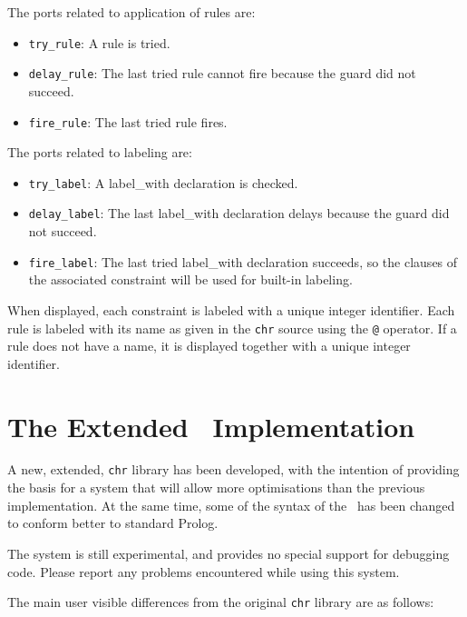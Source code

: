 The ports related to application of rules are:
\begin{itemize}
 \item \verb/try_rule/: A rule is tried.

 \item \verb/delay_rule/: The last tried rule cannot fire because the guard did not succeed.

 \item \verb/fire_rule/: The last tried rule fires.
\end{itemize}

The ports related to labeling are:
\begin{itemize}
 \item \verb/try_label/: A label\_with declaration is checked.

 \item \verb/delay_label/: The last label\_with declaration delays because the guard did not succeed.

 \item \verb/fire_label/: The last tried label\_with declaration succeeds,
so the clauses of the associated constraint will be used for built-in labeling.

\end{itemize}
When displayed, each constraint
is labeled with a unique integer identifier.  Each rule is labeled
with its name as given in the {\tt chr} source using the \verb/@/
operator. If a rule does not have a name, it is displayed together
with a unique integer identifier.

\section{The Extended \chr\ Implementation}
\label{newchr}

A new, extended, {\tt chr} library has been developed, with the intention of providing
the basis for a system that will allow more optimisations than the previous 
implementation. At the same time, some of the syntax of the \chr\  has
been changed to conform better to standard Prolog. 

The system is still experimental, and provides no special support for 
debugging {\chr\ } code. Please report any problems encountered while 
using this system.

The main user visible differences from the original {\tt chr} library are as 
follows:

